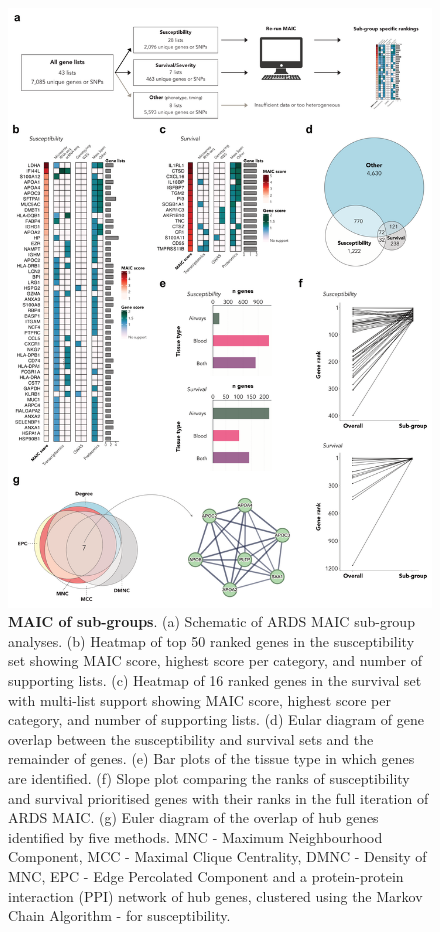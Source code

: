 \documentclass[
  11,
  a4paper,
]{article}
\begin{document}
\begin{figure}

{\centering \includegraphics{./img/Figure_4.png}

}

\caption{\label{fig-fig4}\textbf{MAIC of sub-groups}. (a) Schematic of
ARDS MAIC sub-group analyses. (b) Heatmap of top 50 ranked genes in the
susceptibility set showing MAIC score, highest score per category, and
number of supporting lists. (c) Heatmap of 16 ranked genes in the
survival set with multi-list support showing MAIC score, highest score
per category, and number of supporting lists. (d) Eular diagram of gene
overlap between the susceptibility and survival sets and the remainder
of genes. (e) Bar plots of the tissue type in which genes are
identified. (f) Slope plot comparing the ranks of susceptibility and
survival prioritised genes with their ranks in the full iteration of
ARDS MAIC. (g) Euler diagram of the overlap of hub genes identified by
five methods. MNC - Maximum Neighbourhood Component, MCC - Maximal
Clique Centrality, DMNC - Density of MNC, EPC - Edge Percolated
Component and a protein-protein interaction (PPI) network of hub genes,
clustered using the Markov Chain Algorithm - for susceptibility.}

\end{figure}
\end{document}
